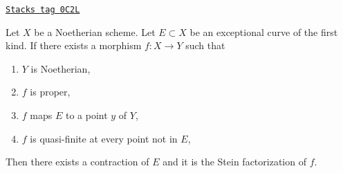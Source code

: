 \begin{lemma}[Contraction]
\label{resolve-lemma-contraction}
\href{https://stacks.math.columbia.edu/tag/0C2L}{\texttt{Stacks tag 0C2L}}

Let $X$ be a Noetherian scheme. Let $E \subset X$ be an
exceptional curve of the first kind. If there exists a morphism
$f : X \to Y$ such that
\begin{enumerate}
\item $Y$ is Noetherian,
\item $f$ is proper,
\item $f$ maps $E$ to a point $y$ of $Y$,
\item $f$ is quasi-finite at every point not in $E$,
\end{enumerate}
Then there exists a contraction of $E$ and it is the Stein
factorization of $f$.
\end{lemma}

